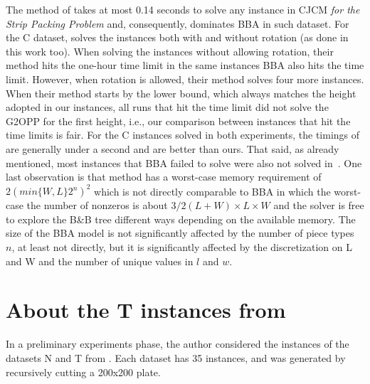The method of \citet{fleszar:2016} takes at most 0.14 seconds to solve any instance in CJCM \emph{for the Strip Packing Problem} and, consequently, dominates BBA in such dataset.
For the C dataset, \citet{fleszar:2016} solves the instances both with and without rotation (as done in this work too).
When solving the instances without allowing rotation, their method hits the one-hour time limit in the same instances BBA also hits the time limit.
However, when rotation is allowed, their method solves four more instances.
When their method starts by the lower bound, which always matches the height adopted in our instances, all runs that hit the time limit did not solve the G2OPP for the first height, i.e., our comparison between instances that hit the time limits is fair.
For the C instances solved in both experiments, the timings of \citet{fleszar:2016} are generally under a second and are better than ours.
That said, as already mentioned, most instances that BBA failed to solve were also not solved in~\citet{fleszar:2016}.
One last observation is that \citet{fleszar:2016} method has a worst-case memory requirement of \(2(min\{W,L\}2^n)^2\) which is not directly comparable to BBA in which the worst-case the number of nonzeros is about \(3/2(L + W) \times L \times W\) and the solver is free to explore the B\&B tree different ways depending on the available memory.
The size of the BBA model is not significantly affected by the number of piece types~\(n\), at least not directly, but it is significantly affected by the discretization on L and W and the number of unique values in \(l\) and \(w\).

\section{About the T instances from \protect\citethopperthesis}
\label{sec:about_T_instances}

In a preliminary experiments phase, the author considered the instances of the datasets N and T from \citet{hopper_thesis}. %
Each dataset has 35 instances, and was generated by recursively cutting a 200x200 plate. %


